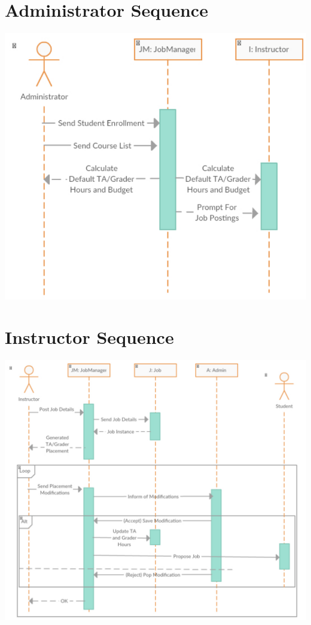 \documentclass[12pt,openany]{report}
\begin{document}
\section{Administrator Sequence}
\includegraphics[scale=1.0]{model/Diagrams/Sequence/SeqAdmin}
\section{Instructor Sequence}
\includegraphics[scale=0.9]{model/Diagrams/Sequence/SeqInstructor}
\end{document}
